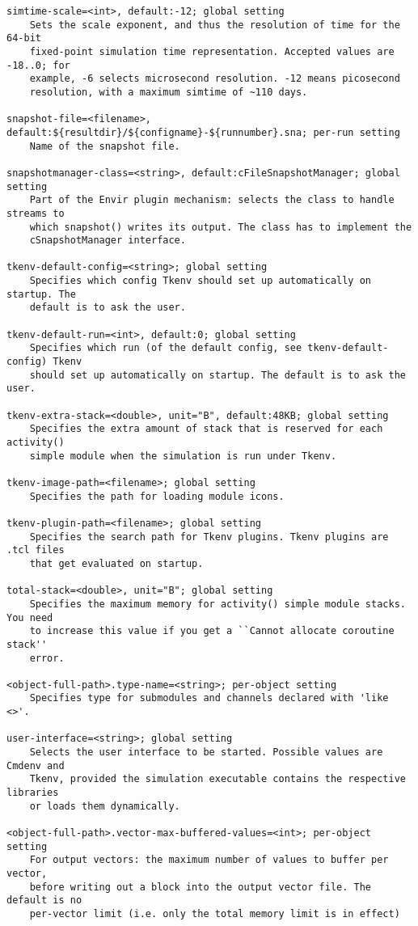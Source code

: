 \begin{verbatim}
simtime-scale=<int>, default:-12; global setting
    Sets the scale exponent, and thus the resolution of time for the 64-bit
    fixed-point simulation time representation. Accepted values are -18..0; for
    example, -6 selects microsecond resolution. -12 means picosecond
    resolution, with a maximum simtime of ~110 days.

snapshot-file=<filename>, default:${resultdir}/${configname}-${runnumber}.sna; per-run setting
    Name of the snapshot file.

snapshotmanager-class=<string>, default:cFileSnapshotManager; global setting
    Part of the Envir plugin mechanism: selects the class to handle streams to
    which snapshot() writes its output. The class has to implement the
    cSnapshotManager interface.

tkenv-default-config=<string>; global setting
    Specifies which config Tkenv should set up automatically on startup. The
    default is to ask the user.

tkenv-default-run=<int>, default:0; global setting
    Specifies which run (of the default config, see tkenv-default-config) Tkenv
    should set up automatically on startup. The default is to ask the user.

tkenv-extra-stack=<double>, unit="B", default:48KB; global setting
    Specifies the extra amount of stack that is reserved for each activity()
    simple module when the simulation is run under Tkenv.

tkenv-image-path=<filename>; global setting
    Specifies the path for loading module icons.

tkenv-plugin-path=<filename>; global setting
    Specifies the search path for Tkenv plugins. Tkenv plugins are .tcl files
    that get evaluated on startup.

total-stack=<double>, unit="B"; global setting
    Specifies the maximum memory for activity() simple module stacks. You need
    to increase this value if you get a ``Cannot allocate coroutine stack''
    error.

<object-full-path>.type-name=<string>; per-object setting
    Specifies type for submodules and channels declared with 'like <>'.

user-interface=<string>; global setting
    Selects the user interface to be started. Possible values are Cmdenv and
    Tkenv, provided the simulation executable contains the respective libraries
    or loads them dynamically.

<object-full-path>.vector-max-buffered-values=<int>; per-object setting
    For output vectors: the maximum number of values to buffer per vector,
    before writing out a block into the output vector file. The default is no
    per-vector limit (i.e. only the total memory limit is in effect)


\end{verbatim}
